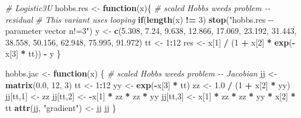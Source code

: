 \documentclass[
]{article}
\newenvironment{Shaded}{\begin{snugshade}}{\end{snugshade}}
\newcommand{\CommentTok}[1]{\textcolor[rgb]{0.56,0.35,0.01}{\textit{#1}}}
\newcommand{\ControlFlowTok}[1]{\textcolor[rgb]{0.13,0.29,0.53}{\textbf{#1}}}
\newcommand{\DecValTok}[1]{\textcolor[rgb]{0.00,0.00,0.81}{#1}}
\newcommand{\FloatTok}[1]{\textcolor[rgb]{0.00,0.00,0.81}{#1}}
\newcommand{\FunctionTok}[1]{\textcolor[rgb]{0.13,0.29,0.53}{\textbf{#1}}}
\newcommand{\NormalTok}[1]{#1}
\newcommand{\OtherTok}[1]{\textcolor[rgb]{0.56,0.35,0.01}{#1}}
\newcommand{\SpecialCharTok}[1]{\textcolor[rgb]{0.81,0.36,0.00}{\textbf{#1}}}
\newcommand{\StringTok}[1]{\textcolor[rgb]{0.31,0.60,0.02}{#1}}
\begin{document}
\begin{Shaded}
\begin{Highlighting}[]
\CommentTok{\# Logistic3U}
\NormalTok{hobbs.res  }\OtherTok{\textless{}{-}}  \ControlFlowTok{function}\NormalTok{(x)\{ }\CommentTok{\# scaled Hobbs weeds problem {-}{-} residual}
  \CommentTok{\# This variant uses looping}
  \ControlFlowTok{if}\NormalTok{(}\FunctionTok{length}\NormalTok{(x) }\SpecialCharTok{!=} \DecValTok{3}\NormalTok{) }\FunctionTok{stop}\NormalTok{(}\StringTok{"hobbs.res {-}{-} parameter vector n!=3"}\NormalTok{)}
\NormalTok{  y  }\OtherTok{\textless{}{-}}  \FunctionTok{c}\NormalTok{(}\FloatTok{5.308}\NormalTok{, }\FloatTok{7.24}\NormalTok{, }\FloatTok{9.638}\NormalTok{, }\FloatTok{12.866}\NormalTok{, }\FloatTok{17.069}\NormalTok{, }\FloatTok{23.192}\NormalTok{, }\FloatTok{31.443}\NormalTok{, }
           \FloatTok{38.558}\NormalTok{, }\FloatTok{50.156}\NormalTok{, }\FloatTok{62.948}\NormalTok{, }\FloatTok{75.995}\NormalTok{, }\FloatTok{91.972}\NormalTok{)}
\NormalTok{  tt  }\OtherTok{\textless{}{-}}  \DecValTok{1}\SpecialCharTok{:}\DecValTok{12}
\NormalTok{  res  }\OtherTok{\textless{}{-}}\NormalTok{  x[}\DecValTok{1}\NormalTok{] }\SpecialCharTok{/}\NormalTok{ (}\DecValTok{1} \SpecialCharTok{+}\NormalTok{ x[}\DecValTok{2}\NormalTok{] }\SpecialCharTok{*} \FunctionTok{exp}\NormalTok{(}\SpecialCharTok{{-}}\NormalTok{x[}\DecValTok{3}\NormalTok{] }\SpecialCharTok{*}\NormalTok{ tt)) }\SpecialCharTok{{-}}\NormalTok{ y}
\NormalTok{\}}

\NormalTok{hobbs.jac  }\OtherTok{\textless{}{-}}  \ControlFlowTok{function}\NormalTok{(x) \{ }\CommentTok{\# scaled Hobbs weeds problem {-}{-} Jacobian}
\NormalTok{  jj  }\OtherTok{\textless{}{-}}  \FunctionTok{matrix}\NormalTok{(}\FloatTok{0.0}\NormalTok{, }\DecValTok{12}\NormalTok{, }\DecValTok{3}\NormalTok{)}
\NormalTok{  tt  }\OtherTok{\textless{}{-}}  \DecValTok{1}\SpecialCharTok{:}\DecValTok{12}
\NormalTok{  yy  }\OtherTok{\textless{}{-}}  \FunctionTok{exp}\NormalTok{(}\SpecialCharTok{{-}}\NormalTok{x[}\DecValTok{3}\NormalTok{] }\SpecialCharTok{*}\NormalTok{ tt)}
\NormalTok{  zz  }\OtherTok{\textless{}{-}}  \FloatTok{1.0} \SpecialCharTok{/}\NormalTok{ (}\DecValTok{1} \SpecialCharTok{+}\NormalTok{ x[}\DecValTok{2}\NormalTok{] }\SpecialCharTok{*}\NormalTok{ yy)}
\NormalTok{  jj[tt,}\DecValTok{1}\NormalTok{]   }\OtherTok{\textless{}{-}}\NormalTok{   zz}
\NormalTok{  jj[tt,}\DecValTok{2}\NormalTok{]   }\OtherTok{\textless{}{-}}   \SpecialCharTok{{-}}\NormalTok{x[}\DecValTok{1}\NormalTok{] }\SpecialCharTok{*}\NormalTok{ zz }\SpecialCharTok{*}\NormalTok{ zz }\SpecialCharTok{*}\NormalTok{ yy}
\NormalTok{  jj[tt,}\DecValTok{3}\NormalTok{]   }\OtherTok{\textless{}{-}}\NormalTok{   x[}\DecValTok{1}\NormalTok{] }\SpecialCharTok{*}\NormalTok{ zz }\SpecialCharTok{*}\NormalTok{ zz }\SpecialCharTok{*}\NormalTok{ yy }\SpecialCharTok{*}\NormalTok{ x[}\DecValTok{2}\NormalTok{] }\SpecialCharTok{*}\NormalTok{ tt}
  \FunctionTok{attr}\NormalTok{(jj, }\StringTok{"gradient"}\NormalTok{) }\OtherTok{\textless{}{-}}\NormalTok{ jj}
\NormalTok{  jj}
\NormalTok{\}}
\end{Highlighting}
\end{Shaded}
\end{document}
